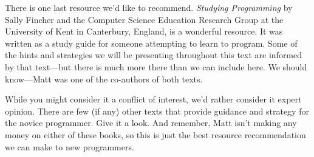 There is one last resource we'd like to recommend. {\em Studying Programming} by Sally Fincher and the Computer Science Education Research Group at the University of Kent in Canterbury, England, is a wonderful resource. It was written as a study guide for someone attempting to learn to program. Some of the hints and strategies we will be presenting throughout this text are informed by that text---but there is much more there than we can include here. We should know---Matt was one of the co-authors of both texts.

\begin{comment}
	\begin{figure}[h!]
	  \begin{center}
	    \texttt{[image: images/studying-programming-cover]}
	  \end{center}
	\end{figure}
\end{comment}

While you might consider it a conflict of interest, we'd rather consider it expert opinion. There are few (if any) other texts that provide guidance and strategy for the novice programmer. Give it a look. And remember, Matt isn't making any money on either of these books, so this is just the best resource recommendation we can make to new programmers.

